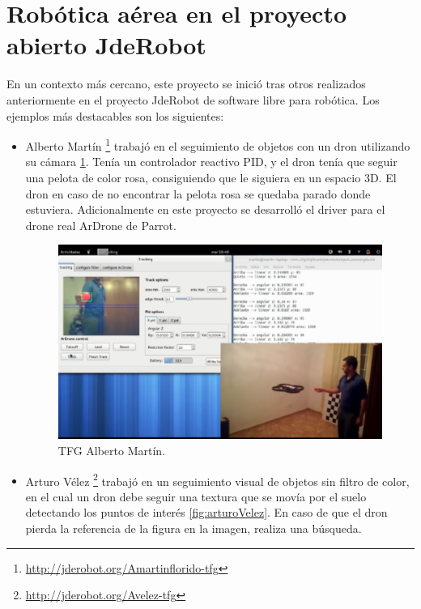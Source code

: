 \section{Robótica aérea en el proyecto abierto JdeRobot}
En un contexto más cercano, este proyecto se inició tras otros realizados anteriormente en el proyecto JdeRobot de software libre para robótica. Los ejemplos más destacables son los siguientes:
\begin{itemize}
\item Alberto Martín\cite{albertoMartin} \footnote{\url{http://jderobot.org/Amartinflorido-tfg}} trabajó en el seguimiento de objetos con un dron
utilizando su cámara \ref{fig:albertoMartin}. Tenía un controlador reactivo PID, y el dron tenía que seguir una pelota de color rosa, consiguiendo que le siguiera en un espacio 3D. El dron en caso de no encontrar la pelota rosa se quedaba parado donde estuviera. Adicionalmente en este proyecto se desarrolló el driver para el drone real ArDrone de Parrot.

\begin{figure}[H]
  \centering
  \includegraphics[scale=0.6]{imagenes/AlbertoMartin.png}
  \caption{TFG Alberto Martín.}
  \label{fig:albertoMartin}
\end{figure}


\item Arturo Vélez\cite{arturoVelez} \footnote{\url{http://jderobot.org/Avelez-tfg}} trabajó en un seguimiento visual de objetos sin filtro de color, en el cual un dron debe seguir una textura que se movía por el suelo detectando los puntos de interés \ref{fig:arturoVelez}. En caso de que el dron pierda la referencia de la figura en la imagen, realiza una búsqueda.


\end{itemize}
